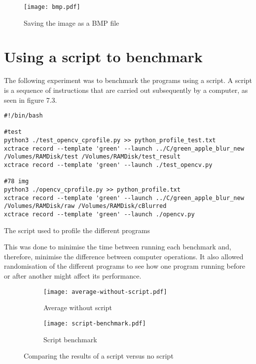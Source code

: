 \begin{figure}[H]
	\centering
	\texttt{[image: bmp.pdf]}
	\caption{Saving the image as a BMP file}
	\label{figure:bmp}
\end{figure}

\section{Using a script to benchmark}
The following experiment was to benchmark the programs using a script. A script is a sequence of instructions that are carried out subsequently by a computer, as seen in figure 7.3.

\begin{listing}[!ht]
	\begin{verbatim}
#!/bin/bash

#test
python3 ./test_opencv_cprofile.py >> python_profile_test.txt
xctrace record --template 'green' --launch ../C/green_apple_blur_new
/Volumes/RAMDisk/test /Volumes/RAMDisk/test_result
xctrace record --template 'green' --launch ./test_opencv.py

#78 img
python3 ./opencv_cprofile.py >> python_profile.txt
xctrace record --template 'green' --launch ../C/green_apple_blur_new
/Volumes/RAMDisk/raw /Volumes/RAMDisk/cBlurred
xctrace record --template 'green' --launch ./opencv.py
	\end{verbatim}
	\caption{The script used to profile the different programs}
	\label{listing:script}
	\end{listing}

This was done to minimise the time between running each benchmark and, therefore, minimise the difference between computer operations. It also allowed randomisation of the different programs to see how one program running before or after another might affect its performance.

\begin{figure}[H]
	\centering
	\begin{subfigure}{.5\textwidth}
	  \centering
	  \texttt{[image: average-without-script.pdf]}
	  \caption{Average without script}
	  \label{fig:no-script}
	\end{subfigure}%
	\begin{subfigure}{.5\textwidth}
	  \centering
	  \texttt{[image: script-benchmark.pdf]}
	  \caption{Script benchmark}
	  \label{fig:script}
	\end{subfigure}
	\caption{Comparing the results of a script versus no script}
	\label{fig:script-vs-noscript}
\end{figure}


